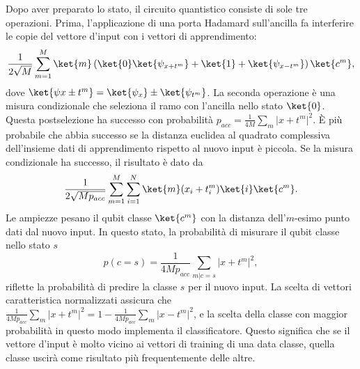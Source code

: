 Dopo aver preparato lo stato, il circuito quantistico 
consiste di sole tre operazioni. Prima, l'applicazione di 
una porta Hadamard sull'ancilla fa interferire le copie 
del vettore d'input con i vettori di apprendimento: 
\begin{equation}
    \frac{1}{2\sqrt{M}} \sum_{m=1}^M \ket{m}
    \left( \ket{0}\ket{\psi_{x+t^m}} + \ket{1} + 
    \ket{\psi_{x-t^m}} \right) \ket{c^m},
\end{equation}
dove $\ket{\psi{x \pm t^m}} = \ket{\psi_x} \pm \ket{\psi_{t^m}}$. 
La seconda operazione è una misura condizionale che seleziona 
il ramo con l'ancilla nello stato $\ket{0}$. Questa 
postselezione ha successo con probabilità 
$p_{acc} = \frac{1}{4M}\sum_m |x+t^m|^2$. 
È più probabile che abbia successo se la distanza euclidea 
al quadrato complessiva dell'insieme dati di apprendimento 
rispetto al nuovo input è piccola. 
Se la misura condizionale ha successo, il risultato è 
dato da 
\begin{equation}
    \frac{1}{2\sqrt{Mp_{acc}}} \sum_{m=1}^M \sum_{i=1}^N 
    \ket{m} ( x_i + t_i^m ) \ket{i} \ket{c^m}.
\end{equation}
Le ampiezze pesano il qubit classe $\ket{c^m}$ con la 
distanza dell'$m$-esimo punto dati dal nuovo input. 
In questo stato, la probabilità di misurare il qubit 
classe nello stato $s$ 
\begin{equation}
    p(c=s) = \frac{1}{4Mp_{acc}} \sum_{m|c=s} 
    |x+t^m|^2,
\end{equation}
riflette la probabilità di predire la classe $s$ per il 
nuovo input. 
La scelta di vettori caratteristica normalizzati assicura 
che $\frac{1}{4Mp_{acc}}\sum_m |x+t^m|^2 = 
1 - \frac{1}{4Mp_{acc}}\sum_m |x-t^m|^2$, e la scelta 
della classe con maggior probabilità in questo modo 
implementa il classificatore. 
Questo significa che se il vettore d'input è molto 
vicino ai vettori di training di una data classe, 
quella classe uscirà come risultato più frequentemente 
delle altre. 

